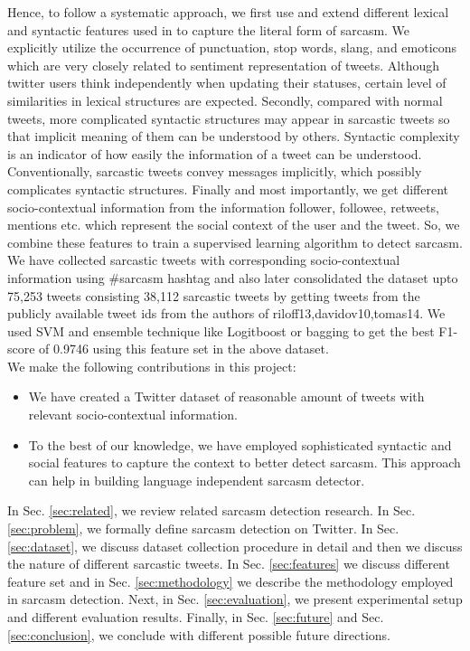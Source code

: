 Hence, to follow a systematic approach, we first use and extend different lexical and syntactic features used in \cite{riloff13,davidov10,tomas14,gonzalez_acl} to capture the literal form of sarcasm. We explicitly utilize the occurrence of punctuation, stop words, slang, and emoticons which are very closely related to sentiment representation of tweets. Although twitter users think independently when updating their statuses, certain level of similarities in lexical structures are expected. Secondly, compared with normal tweets, more complicated syntactic structures may appear in sarcastic tweets so that implicit meaning of them can be understood by others. Syntactic complexity is an indicator of how easily the information of a tweet can be understood. Conventionally, sarcastic tweets convey messages implicitly, which possibly complicates syntactic structures. Finally and most importantly, we get different socio-contextual information from the information follower, followee, retweets, mentions etc. which represent the social context of the user and the tweet. So, we combine these features to train a supervised learning algorithm to detect sarcasm. We have collected sarcastic tweets with corresponding socio-contextual information using \#sarcasm hashtag and also later consolidated the dataset upto 75,253 tweets consisting 38,112 sarcastic tweets by getting tweets from the publicly available tweet ids from the authors of {riloff13,davidov10,tomas14}. We used SVM and ensemble technique like Logitboost or bagging to get the best F1-score of 0.9746 using this feature set in the above dataset.\\ 

\noindent We make the following contributions in this project:
\begin{itemize}
 \item We have created a Twitter dataset of reasonable amount of tweets with relevant socio-contextual information.
 \item To the best of our knowledge, we have employed sophisticated syntactic and social features to capture the context to better detect sarcasm. This approach can help in building language independent sarcasm detector.\\
\end{itemize}

In Sec. \ref{sec:related}, we review related sarcasm detection research. In Sec. \ref{sec:problem}, we formally define sarcasm detection on Twitter. In Sec. \ref{sec:dataset}, we discuss dataset collection procedure in detail and then we discuss the nature of different sarcastic tweets. In Sec. \ref{sec:features} we discuss different feature set and in Sec. \ref{sec:methodology} we describe the methodology employed in sarcasm detection. Next, in Sec. \ref{sec:evaluation}, we present experimental setup and different evaluation results. Finally, in Sec. \ref{sec:future} and Sec. \ref{sec:conclusion}, we conclude with different possible future directions.



